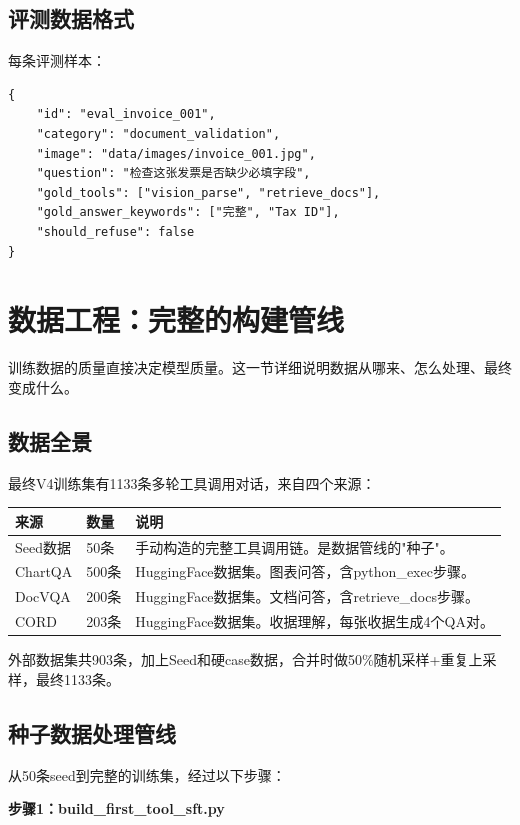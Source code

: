\documentclass[fontset=none,11pt,a4paper]{ctexart}
\begin{document}
\subsection{评测数据格式}

每条评测样本：
\begin{lstlisting}
{
    "id": "eval_invoice_001",
    "category": "document_validation",
    "image": "data/images/invoice_001.jpg",
    "question": "检查这张发票是否缺少必填字段",
    "gold_tools": ["vision_parse", "retrieve_docs"],
    "gold_answer_keywords": ["完整", "Tax ID"],
    "should_refuse": false
}
\end{lstlisting}

\newpage

\section{数据工程：完整的构建管线}

训练数据的质量直接决定模型质量。这一节详细说明数据从哪来、怎么处理、最终变成什么。

\subsection{数据全景}

最终V4训练集有1133条多轮工具调用对话，来自四个来源：

\begin{longtable}{llp{6cm}}
\toprule
来源 & 数量 & 说明 \\
\midrule
Seed数据 & 50条 & 手动构造的完整工具调用链。是数据管线的"种子"。 \\
ChartQA & 500条 & HuggingFace数据集。图表问答，含python\_exec步骤。 \\
DocVQA & 200条 & HuggingFace数据集。文档问答，含retrieve\_docs步骤。 \\
CORD & 203条 & HuggingFace数据集。收据理解，每张收据生成4个QA对。 \\
\bottomrule
\end{longtable}

外部数据集共903条，加上Seed和硬case数据，合并时做50\%随机采样+重复上采样，最终1133条。

\subsection{种子数据处理管线}

从50条seed到完整的训练集，经过以下步骤：

\textbf{步骤1：build\_first\_tool\_sft.py}
\end{document}
